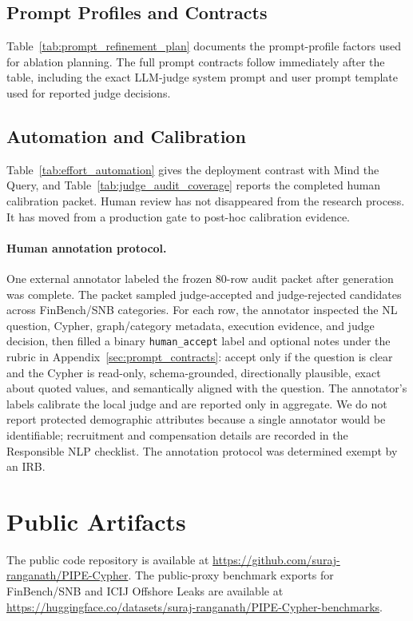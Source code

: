 \documentclass[11pt]{article}
\begin{document}


\subsection{Prompt Profiles and Contracts}

Table~\ref{tab:prompt_refinement_plan} documents the prompt-profile factors used for ablation planning. The full prompt contracts follow immediately after the table, including the exact LLM-judge system prompt and user prompt template used for reported judge decisions.




\subsection{Automation and Calibration}

Table~\ref{tab:effort_automation} gives the deployment contrast with Mind the Query, and Table~\ref{tab:judge_audit_coverage} reports the completed human calibration packet. Human review has not disappeared from the research process. It has moved from a production gate to post-hoc calibration evidence.

\paragraph{Human annotation protocol.}
One external annotator labeled the frozen 80-row audit packet after generation was complete. The packet sampled judge-accepted and judge-rejected candidates across FinBench/SNB categories. For each row, the annotator inspected the NL question, Cypher, graph/category metadata, execution evidence, and judge decision, then filled a binary \texttt{human\_accept} label and optional notes under the rubric in Appendix~\ref{sec:prompt_contracts}: accept only if the question is clear and the Cypher is read-only, schema-grounded, directionally plausible, exact about quoted values, and semantically aligned with the question. The annotator's labels calibrate the local judge and are reported only in aggregate. We do not report protected demographic attributes because a single annotator would be identifiable; recruitment and compensation details are recorded in the Responsible NLP checklist. The annotation protocol was determined exempt by an IRB.




\section{Public Artifacts}

The public code repository is available at \url{https://github.com/suraj-ranganath/PIPE-Cypher}. The public-proxy benchmark exports for FinBench/SNB and ICIJ Offshore Leaks are available at \url{https://huggingface.co/datasets/suraj-ranganath/PIPE-Cypher-benchmarks}.

\FloatBarrier
\clearpage

\end{document}
